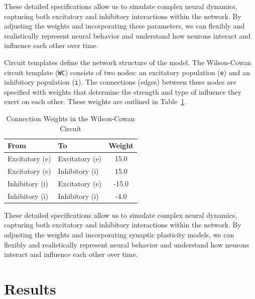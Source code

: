 \documentclass[12pt]{article}
\begin{document}
These detailed specifications allow us to simulate complex neural dynamics, capturing both excitatory and inhibitory interactions within the network. By adjusting the weights and incorporating these parameters, we can flexibly and realistically represent neural behavior and understand how neurons interact and influence each other over time.


Circuit templates define the network structure of the model. The Wilson-Cowan circuit template (\texttt{WC}) consists of two nodes: an excitatory population (\texttt{e}) and an inhibitory population (\texttt{i}). The connections (edges) between these nodes are specified with weights that determine the strength and type of influence they exert on each other. These weights are outlined in Table~\ref{tab:weights}.

\begin{table}[h]
    \centering
    \caption{Connection Weights in the Wilson-Cowan Circuit}
    \label{tab:weights}
    \begin{tabular}{@{}llc@{}}
        \toprule
        \textbf{From} & \textbf{To} & \textbf{Weight} \\ \midrule
        Excitatory (e) & Excitatory (e) & 15.0 \\
        Excitatory (e) & Inhibitory (i) & 15.0 \\
        Inhibitory (i) & Excitatory (e) & -15.0 \\
        Inhibitory (i) & Inhibitory (i) & -4.0 \\ \bottomrule
    \end{tabular}
\end{table}

These detailed specifications allow us to simulate complex neural dynamics, capturing both excitatory and inhibitory interactions within the network. By adjusting the weights and incorporating synaptic plasticity models, we can flexibly and realistically represent neural behavior and understand how neurons interact and influence each other over time.

\section{Results}
\end{document}
